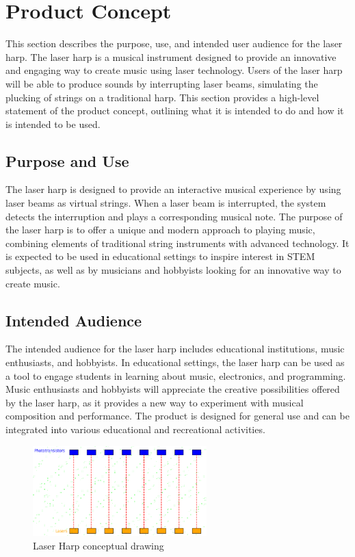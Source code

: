 \section{Product Concept}

This section describes the purpose, use, and intended user audience for the laser harp. The laser harp is a musical instrument designed to provide an innovative and engaging way to create music using laser technology. Users of the laser harp will be able to produce sounds by interrupting laser beams, simulating the plucking of strings on a traditional harp. This section provides a high-level statement of the product concept, outlining what it is intended to do and how it is intended to be used.

\subsection{Purpose and Use}
The laser harp is designed to provide an interactive musical experience by using laser beams as virtual strings. When a laser beam is interrupted, the system detects the interruption and plays a corresponding musical note. The purpose of the laser harp is to offer a unique and modern approach to playing music, combining elements of traditional string instruments with advanced technology. It is expected to be used in educational settings to inspire interest in STEM subjects, as well as by musicians and hobbyists looking for an innovative way to create music.

\subsection{Intended Audience}
The intended audience for the laser harp includes educational institutions, music enthusiasts, and hobbyists. In educational settings, the laser harp can be used as a tool to engage students in learning about music, electronics, and programming. Music enthusiasts and hobbyists will appreciate the creative possibilities offered by the laser harp, as it provides a new way to experiment with musical composition and performance. The product is designed for general use and can be integrated into various educational and recreational activities.

\begin{figure}[h!]
	\centering
   	\includegraphics[width=0.60\textwidth]{images/Design}
    \caption{Laser Harp conceptual drawing}
\end{figure}
